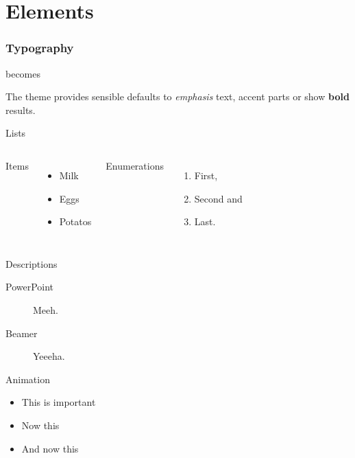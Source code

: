 \documentclass[10pt, compress]{beamer}
\begin{document}
\section{Elements}

\begin{frame}[fragile]
  \frametitle{Typography}

  \begin{center}becomes\end{center}

  The theme provides sensible defaults to \emph{emphasis} text,
  \alert{accent} parts or show \textbf{bold} results.
\end{frame}
\begin{frame}{Lists}
  \begin{columns}[onlytextwidth]
      Items
      \begin{itemize}
        \item Milk \item Eggs \item Potatos
      \end{itemize}

      Enumerations
      \begin{enumerate}
        \item First, \item Second and \item Last.
      \end{enumerate}
  \end{columns}
\end{frame}
\begin{frame}{Descriptions}
  \begin{description}
    \item[PowerPoint] Meeh.
    \item[Beamer] Yeeeha.
  \end{description}
\end{frame}
\begin{frame}{Animation}
  \begin{itemize}[<+- | alert@+>]
    \item \alert<4>{This is important}
    \item Now this
    \item And now this
  \end{itemize}
\end{frame}
\end{document}

